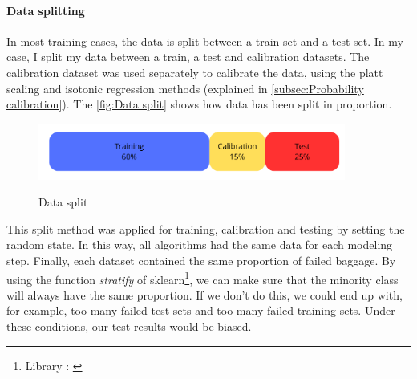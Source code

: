 \documentclass[12pt]{article}
\begin{document}
\paragraph{Data splitting} In most training cases, the data is split between a train set and a test set. In my case, I split my data between a train, a test and calibration datasets.
The calibration dataset was used separately to calibrate the data, using the platt scaling and isotonic regression methods (explained in \autoref{subsec:Probability calibration}). The \autoref{fig:Data split} shows how data has been split in proportion.
\begin{figure}[h]
    \centering
    \includegraphics[width=0.9\textwidth]{Data splitting.png}\\
    \caption{Data split}
    \label{fig:Data split}
\end{figure}
\FloatBarrier
This split method was applied for training, calibration and testing by setting the random state. In this way, all algorithms had the same data for each modeling step. 
Finally, each dataset contained the same proportion of failed baggage. By using the function \textit{stratify} of sklearn\footnote{Library : \cite{StratifySplit}}, we can make sure that the minority class will always have the same proportion. If we don't do this, we could end up with, for example, too many failed test sets and too many failed training sets. Under these conditions, our test results would be biased.
\end{document}

